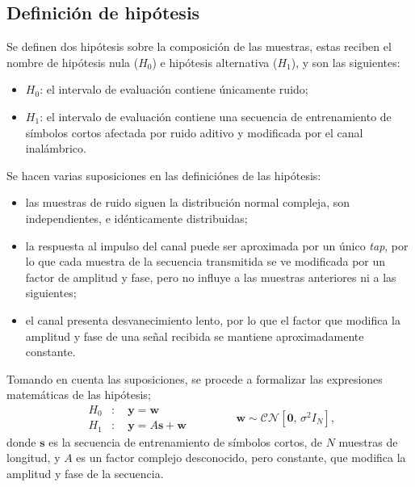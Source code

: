 \subsection{Definición de hipótesis}
\label{Ss:def-hipotesis}

Se definen dos hipótesis sobre la composición de las muestras, estas reciben el nombre de hipótesis nula ($H_0$) e hipótesis alternativa ($H_1$), y son las siguientes:
\begin{itemize}
    \item $H_0$: el intervalo de evaluación contiene únicamente ruido;
    \item $H_1$: el intervalo de evaluación contiene una secuencia de entrenamiento de símbolos cortos afectada por ruido aditivo y modificada por el canal inalámbrico.
\end{itemize}

Se hacen varias suposiciones en las definiciónes de las hipótesis:
\begin{itemize}
    \item las muestras de ruido siguen la distribución normal compleja, son independientes, e idénticamente distribuidas;
    \item la respuesta al impulso del canal puede ser aproximada por un único \textit{tap}, por lo que cada muestra de la secuencia transmitida se ve modificada por un factor de amplitud y fase, pero no influye a las muestras anteriores ni a las siguientes;
    \item el canal presenta desvanecimiento lento, por lo que el factor que modifica la amplitud y fase de una señal recibida se mantiene aproximadamente constante.
\end{itemize}

Tomando en cuenta las suposiciones, se procede a formalizar las expresiones matemáticas de las hipótesis;
\begin{equation}\label{eq:def-hipótesis}
    \begin{aligned}
        H_0&: \quad \mathbf{y} = \mathbf{w}\\
        H_1&: \quad \mathbf{y} = A\mathbf{s} + \mathbf{w}
    \end{aligned}
    \qquad\qquad
    \mathbf{w} \sim \mathcal{CN}\left[\mathbf{0},\, \sigma^2 I_N\right],
\end{equation}
donde $\mathbf{s}$ es la secuencia de entrenamiento de símbolos cortos, de $N$ muestras de longitud, y $A$ es un factor complejo desconocido, pero constante, que modifica la amplitud y fase de la secuencia. 

